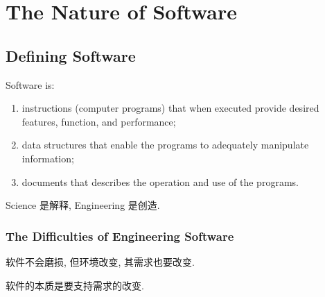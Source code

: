 \newpage
\section{The Nature of Software}
\subsection{Defining Software}
Software is: 
\begin{enumerate}
    \item instructions (computer programs) that when executed provide desired features, function, and performance; 
    \item data structures that enable the programs to adequately manipulate information; 
    \item documents that describes the operation and use of the programs.
\end{enumerate}

Science 是解释,  Engineering 是创造.

\subsubsection{The Difficulties of Engineering Software}
软件不会磨损, 但环境改变, 其需求也要改变.

软件的本质是要支持需求的改变.

